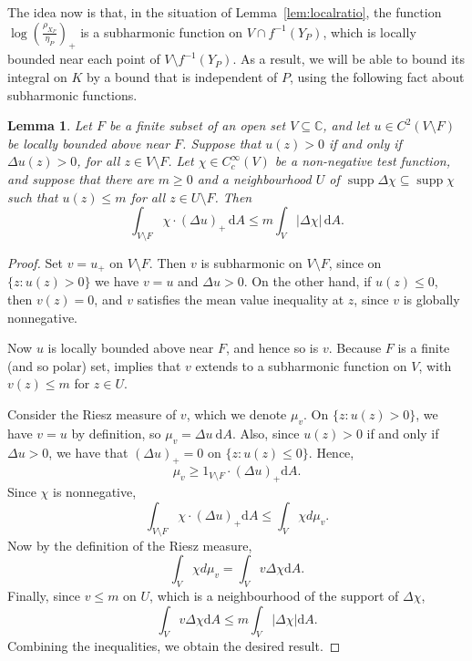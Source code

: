 \documentclass[12pt,a4paper,reqno]{amsart}
\theoremstyle{plain}
\newtheorem{lem}[thm]{Lemma}
\newcommand{\dA}{\mathrm dA}
\renewcommand{\subset}{\subseteq}
\theoremstyle{definition}
\theoremstyle{remark}
\numberwithin{equation}{section}
\newcommand \C{\mathbb{C}}
\begin{document}
The idea now is that, in the situation of Lemma~\ref{lem:localratio}, the 
  function $\log\left(\frac{\rho_{X_P}}{\eta_P}\right)_+$ is a
  subharmonic function on $V\cap f^{-1}(Y_P)$, which is locally bounded
  near each point of $V\setminus f^{-1}(Y_P)$. As a result, we will be 
  able to bound its integral on $K$ by a bound that is independent of $P$, using  
  the following fact about subharmonic functions. 

\newcommand{\supp}{\operatorname{supp}}

\begin{lem}\label{lem:positivecutoff}
Let $F$ be a finite subset of an open set $V\subset\C$, and let $u\in C^2(V\setminus F)$
be locally bounded above near $F$. Suppose that $u(z)>0$ if and only if
$\Delta u(z)>0$, for all $z\in V\setminus F$. 
Let $\chi\in C_c^{\infty}(V)$ be a non-negative test function, and suppose that there are  
   $m\geq 0$ and a neighbourhood $U$ of $\supp \Delta\chi\subset \supp \chi$ such that $u(z)\leq m$
   for all $z\in U\setminus F$. Then
\[
 \int_{V\setminus F}\chi \cdot(\Delta u)_+\,\dA
 \le m\int_V|\Delta\chi|\,\dA.
\]
\end{lem}
\begin{proof}
Set $v=u_+$ on $V\setminus F$. Then $v$ is subharmonic on $V\setminus F$, since on $\{z\colon u(z)>0\}$ we have $v=u$ and $\Delta u>0$. On the other hand, if $u(z)\leq 0$,
then $v(z)=0$, and $v$ satisfies the mean value inequality
at $z$, since $v$ is globally nonnegative. 

Now $u$ is locally bounded above near $F$, and hence so is $v$. Because $F$ is a finite (and so polar) set, \cite[Theorem 5.18]{hayman-kennedy76} implies that $v$ extends to a subharmonic function on $V$, with
$v(z)\leq m$ for $z\in U$. 

Consider the Riesz measure of $v$, which we denote $\mu_v$. On $\{z\colon u(z)>0\}$, we have $v=u$  by definition, so $\mu_v=\Delta u ~\dA$. Also, since $u(z)>0$ if and only if $\Delta u>0$, we have that $(\Delta u)_+=0$ on $\{z: u(z) \leq 0\}$. 
Hence,
\[\mu_v \geq 1_{V\setminus F}\cdot (\Delta u)_+ \dA.\]
Since $\chi$ is nonnegative,
\[\int_{V\setminus F}\chi\cdot (\Delta u)_+ \dA \leq \int_V\chi d\mu_v.\]
Now by the definition of the Riesz measure,
\[\int_{V}\chi d\mu_v = \int_Vv\Delta\chi \dA.\]
Finally, since $v\leq m$ on $U$, which is 
  a neighbourhood of the support of $\Delta\chi$,
\[\int_Vv\Delta\chi \dA \leq m \int_V|\Delta\chi| \dA .\]
Combining the inequalities, we obtain the desired result.
\end{proof}
\end{document}
